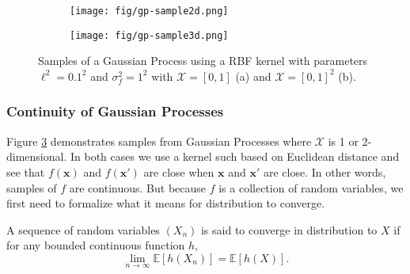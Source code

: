 \begin{figure}
    \centering
    \begin{subfigure}[b]{0.45\textwidth}
        \centering
        \texttt{[image: fig/gp-sample2d.png]}
        \caption{}
        \label{subfig:2d-gp-sample}
    \end{subfigure}
    \hfill
    \begin{subfigure}[b]{0.45\textwidth}
        \centering
        \texttt{[image: fig/gp-sample3d.png]}
        \caption{}
        \label{subfig:3d-gp-sample}
    \end{subfigure}
    \hfill
    \caption{Samples of a Gaussian Process using a RBF kernel with parameters $\ell^{2} = 0.1^2$ and $\sigma^{2}_f = 1 ^ 2$ with
    $\mathcal{X} = [0, 1]$ (a) and $\mathcal{X} = [0, 1]^2$ (b).
    }
    \label{fig:gp-sample}
\end{figure}

\subsubsection{Continuity of Gaussian Processes}

Figure \ref{fig:gp-sample} demonstrates samples from Gaussian Processes where $\mathcal{X}$ is 1 or 2-dimensional.
In both cases we use a kernel such based on Euclidean distance and see that $f(\mathbf{x})$ and $f(\mathbf{x}')$ are close when $\mathbf{x}$ and $\mathbf{x}'$ are close.
In other words, samples of $f$ are continuous.
But because $f$ is a collection of random variables, we first need to formalize what it means for distribution to converge.

\begin{definition}\label{def:cvg-dst}
    A sequence of random variables $(X_n)$ is said to converge in distribution to $X$
    if for any bounded continuous function $h$,
    \begin{equation*}
        \lim_{n\to \infty} \mathbb{E}[h(X_n)] = \mathbb{E}[h(X)].
    \end{equation*}
\end{definition}

